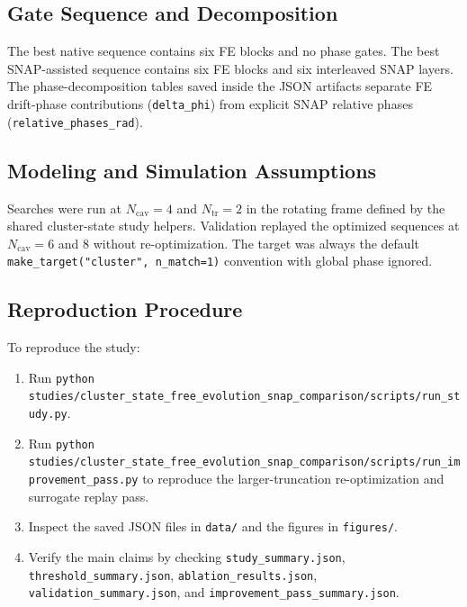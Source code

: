 \documentclass[aps,pra,twocolumn,reprint,amsmath,amssymb]{revtex4-2}
\begin{document}
\subsection{Gate Sequence and Decomposition}
The best native sequence contains six FE blocks and no phase gates. The best
SNAP-assisted sequence contains six FE blocks and six interleaved SNAP layers.
The phase-decomposition tables saved inside the JSON artifacts separate FE
drift-phase contributions (\texttt{delta\_phi}) from explicit SNAP relative
phases (\texttt{relative\_phases\_rad}).

\subsection{Modeling and Simulation Assumptions}
Searches were run at $N_{\mathrm{cav}}=4$ and $N_{\mathrm{tr}}=2$ in the
rotating frame defined by the shared cluster-state study helpers. Validation
replayed the optimized sequences at $N_{\mathrm{cav}}=6$ and 8 without
re-optimization. The target was always the default
\texttt{make\_target("cluster", n\_match=1)} convention with global phase
ignored.

\subsection{Reproduction Procedure}
To reproduce the study:
\begin{enumerate}
  \item Run
  \texttt{python studies/cluster\_state\_free\_evolution\_snap\_comparison/scripts/run\_study.py}.
  \item Run
  \texttt{python studies/cluster\_state\_free\_evolution\_snap\_comparison/scripts/run\_improvement\_pass.py}
  to reproduce the larger-truncation re-optimization and surrogate replay pass.
  \item Inspect the saved JSON files in \texttt{data/} and the figures in
  \texttt{figures/}.
  \item Verify the main claims by checking
  \texttt{study\_summary.json}, \texttt{threshold\_summary.json},
  \texttt{ablation\_results.json}, \texttt{validation\_summary.json}, and
  \texttt{improvement\_pass\_summary.json}.
\end{enumerate}
\end{document}
